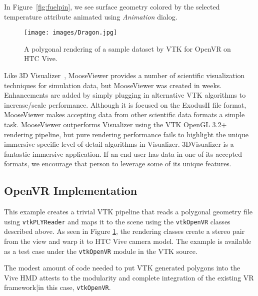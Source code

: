 In Figure~\ref{fig:fuelpin}, we see surface geometry colored by the selected temperature attribute animated using \textit{Animation} dialog.

\begin{figure}[h!]
  \centering
  \texttt{[image: images/Dragon.jpg]}
  \caption{A polygonal rendering of a sample dataset by VTK for OpenVR on HTC Vive.}
  \label{fig:openvrdragon}
\end{figure}

Like 3D Visualizer~\cite{Billen:2008}, MooseViewer provides a number of scientific visualization techniques for simulation data, but MooseViewer was created in weeks. Enhancements are added by simply plugging in alternative VTK algorithms to increase/scale performance.  Although it is focused on the ExodusII file format, MooseViewer makes accepting data from other scientific data formats a simple task. MooseViewer outperforms Visualizer using the VTK OpenGL 3.2+ rendering pipeline, but pure rendering performance fails to highlight the unique immersive-specific level-of-detail algorithms in Visualizer. 3DVisualizer is a fantastic immersive application. If an end user has data in one of its accepted formats, we encourage that person to leverage some of its unique features.


\subsection{OpenVR Implementation}

This example creates a trivial VTK pipeline that reads a polygonal geometry file
using \texttt{vtkPLYReader} and maps it to the scene using the \texttt{vtkOpenVR}
classes described above. As seen in Figure \ref{fig:openvrdragon}, the rendering
classes create a stereo pair from the view and warp it to HTC Vive camera model. 
The example is available as a test case under the
\texttt{vtkOpenVR} module in the VTK source.

The modest amount of code needed to put VTK generated polygons into the
Vive HMD attests to the modularity and complete integration of the
existing VR framework|in this case, \texttt{vtkOpenVR}.
